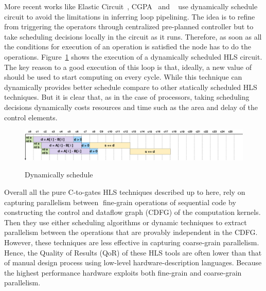 More recent works like Elastic Circuit~\cite{elasticCircuit, elasticFlow}, CGPA~\cite{cgpa} and ~\cite{josipovic_fpga_2018_dynamically} use dynamically schedule circuit to avoid the limitations in inferring loop pipelining.
The idea is to refine from triggering the operators through centralized pre-planned controller but to take scheduling decisions locally in the circuit as it runs.
Therefore, as soon as all the conditions for execution of an operation is satisfied the node has to do the operations.
Figure~\ref{fig:dynamic_schedule} shows the execution of a dynamically scheduled HLS circuit.
The key reason to a good execution of this loop is that, ideally, a new value of  should be used to start computing  on every cycle.
While this technique can dynamically provides better schedule compare to other statically scheduled HLS techniques.
But it is clear that, as in the case of processors, taking scheduling decisions dynamically costs resources and time such as the area and delay of the control elements.

\begin{figure}[!h]
    \centering
    \includegraphics[width=1\textwidth]{figures/Introduction/schedule_dynamic.pdf}
    \label{fig:dynamic_schedule}
    \caption{Dynamically schedule}
\end{figure}  

Overall all the pure C-to-gates HLS techniques described up to here, rely on capturing parallelism between fine-grain operations of sequential code by constructing the control and dataflow graph (CDFG) of the computation kernels.
Then they use either scheduling algorithms or dynamic techniques to extract parallelism between the operations that are provably independent in the CDFG.
However, these techniques are less effective in capturing coarse-grain parallelism.
Hence, the Quality of Results (QoR) of these HLS tools are often lower than that of manual design process using low-level hardware-description languages.
Because the highest performance hardware exploits both fine-grain and coarse-grain parallelism.

